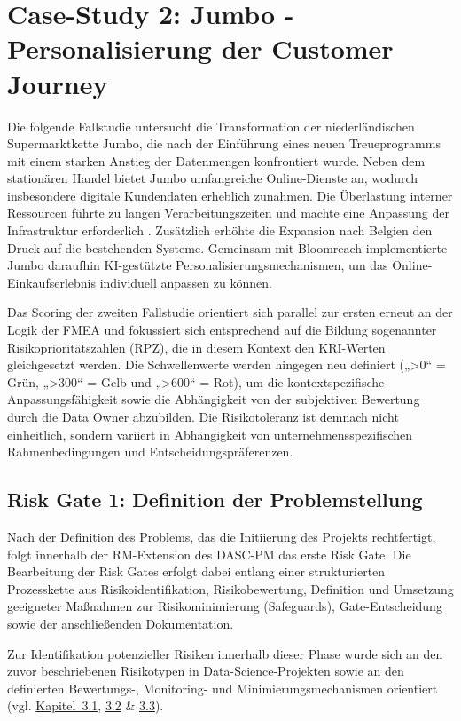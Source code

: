 \section{Case-Study 2: Jumbo - Personalisierung der Customer Journey} \label{sec:case_study_2}
Die folgende Fallstudie untersucht die Transformation der niederländischen Supermarktkette Jumbo, die nach der Einführung eines neuen Treueprogramms mit einem starken Anstieg der Datenmengen konfrontiert wurde. Neben dem stationären Handel bietet Jumbo umfangreiche Online-Dienste an, wodurch insbesondere digitale Kundendaten erheblich zunahmen. Die Überlastung interner Ressourcen führte zu langen Verarbeitungszeiten und machte eine Anpassung der Infrastruktur erforderlich \cite{Kuling_Case_Study_2022}. Zusätzlich erhöhte die Expansion nach Belgien den Druck auf die bestehenden Systeme. Gemeinsam mit Bloomreach implementierte Jumbo daraufhin KI-gestützte Personalisierungsmechanismen, um das Online-Einkaufserlebnis individuell anpassen zu können.

Das Scoring der zweiten Fallstudie orientiert sich parallel zur ersten erneut an der Logik der FMEA und fokussiert sich entsprechend auf die Bildung sogenannter Risikoprioritätszahlen (RPZ), die in diesem Kontext den KRI-Werten gleichgesetzt werden. Die Schwellenwerte werden hingegen neu definiert („>0“ = Grün, „>300“ = Gelb und „>600“ = Rot), um die kontextspezifische Anpassungsfähigkeit sowie die Abhängigkeit von der subjektiven Bewertung durch die Data Owner abzubilden. Die Risikotoleranz ist demnach nicht einheitlich, sondern variiert in Abhängigkeit von unternehmensspezifischen Rahmenbedingungen und Entscheidungspräferenzen.

\subsection{Risk Gate 1: Definition der Problemstellung}
Nach der Definition des Problems, das die Initiierung des Projekts rechtfertigt, 
folgt innerhalb der RM-Extension des DASC-PM das erste Risk Gate. 
Die Bearbeitung der Risk Gates erfolgt dabei entlang einer strukturierten Prozesskette aus 
Risikoidentifikation, Risikobewertung, Definition und Umsetzung geeigneter Maßnahmen 
zur Risikominimierung (Safeguards), Gate-Entscheidung sowie der anschließenden Dokumentation.

Zur Identifikation potenzieller Risiken innerhalb dieser Phase wurde sich an den zuvor 
beschriebenen Risikotypen in Data-Science-Projekten sowie an den definierten Bewertungs-, 
Monitoring- und Minimierungsmechanismen orientiert (vgl. \hyperref[sec:methode1]{Kapitel~3.1}, \hyperref[sec:methode2]{3.2} \& \hyperref[sec:risiko_monitoring]{3.3}).

